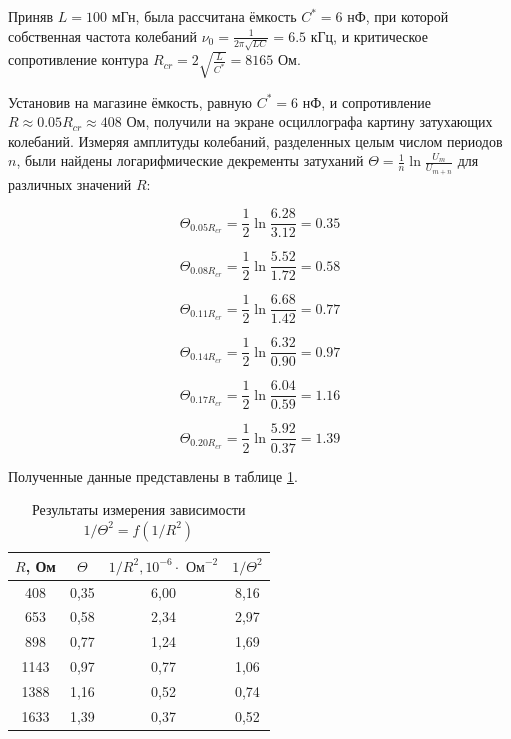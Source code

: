 \documentclass[a4paper, 12pt]{article}
\begin{document}
    Приняв $L = 100$ мГн, была рассчитана ёмкость $C^* = 6$ нФ, при которой собственная частота колебаний $\nu_0 = \frac{1}{2 \pi \sqrt{LC}} = 6.5$ кГц, и критическое сопротивление контура $R_{cr} = 2 \sqrt{\frac{L}{C^*}} = 8165$ Ом.

    Установив на магазине ёмкость, равную $C^* = 6$ нФ, и сопротивление $R \approx 0.05 R_{cr} \approx 408$ Ом, получили на экране осциллографа картину затухающих колебаний. Измеряя амплитуды колебаний, разделенных целым числом периодов $n$, были найдены логарифмические декременты затуханий $\Theta = \frac{1}{n} \ln{\frac{U_m}{U_{m+n}}}$ для различных значений $R$:

    $$
    \Theta_{0.05 R_{cr}} = \frac{1}{2} \ln{\frac{6.28}{3.12}} = 0.35
    $$

    $$
    \Theta_{0.08 R_{cr}} = \frac{1}{2} \ln{\frac{5.52}{1.72}} = 0.58
    $$

    $$
    \Theta_{0.11 R_{cr}} = \frac{1}{2} \ln{\frac{6.68}{1.42}} = 0.77
    $$

    $$
    \Theta_{0.14 R_{cr}} = \frac{1}{2} \ln{\frac{6.32}{0.90}} = 0.97
    $$

    $$
    \Theta_{0.17 R_{cr}} = \frac{1}{2} \ln{\frac{6.04}{0.59}} = 1.16
    $$

    $$
    \Theta_{0.20 R_{cr}} = \frac{1}{2} \ln{\frac{5.92}{0.37}} = 1.39
    $$

    Полученные данные представлены в таблице \ref{table:2.3.5}.
    
    \begin{table}[H]
        \centering
        \begin{tabular}{|c|c|c|c|}
        \hline
        $R$, Ом & $\Theta$ & $1/R^2, 10^{-6} \cdot \text{ Ом}^{-2}$ & $1/\Theta^2$ \\ \hline
        408 & 0,35 & 6,00 & 8,16 \\ \hline
        653 & 0,58 & 2,34 & 2,97 \\ \hline
        898 & 0,77 & 1,24 & 1,69 \\ \hline
        1143 & 0,97 & 0,77 & 1,06 \\ \hline
        1388 & 1,16 & 0,52 & 0,74 \\ \hline
        1633 & 1,39 & 0,37 & 0,52 \\ \hline
        \end{tabular}
        \caption{Результаты измерения зависимости $1/\Theta^2 = f(1/R^2)$}
        \label{table:2.3.5}
    \end{table}
\end{document}
